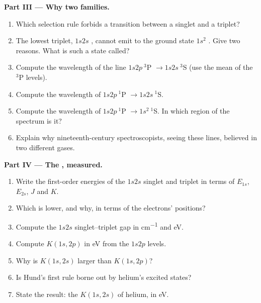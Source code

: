 \begin{problem}
\medskip\noindent\textbf{Part III --- Why two families.}
\begin{enumerate}[resume]
  \item Which selection rule forbids a transition between a singlet and a
        triplet?
  \item The lowest triplet, $1s2s$ , cannot emit to the ground
        state $1s^2$ . Give two reasons. What is such a state
        called?
  \item Compute the wavelength of the line $1s2p\ {}^3$P $\to 1s2s\ {}^3$S (use
        the mean of the ${}^3$P levels).
  \item Compute the wavelength of $1s2p\ {}^1$P $\to 1s2s\ {}^1$S.
  \item Compute the wavelength of $1s2p\ {}^1$P $\to 1s^2\ {}^1$S. In which
        region of the spectrum is it?
  \item Explain why nineteenth-century spectroscopists, seeing these lines,
        believed in two different gases.
\end{enumerate}

\medskip\noindent\textbf{Part IV --- The , measured.}
\begin{enumerate}[resume]
  \item Write the first-order energies of the $1s2s$ singlet and triplet in
        terms of $E_{1s}$, $E_{2s}$, $J$ and $K$.
  \item Which is lower, and why, in terms of the electrons' positions?
  \item Compute the $1s2s$ singlet--triplet gap in \unit{cm^{-1}} and eV.
  \item Compute $K(1s,2p)$ in eV from the $1s2p$ levels.
  \item Why is $K(1s,2s)$ larger than $K(1s,2p)$?
  \item Is Hund's first rule borne out by helium's excited states?
  \item State the result: the  $K(1s,2s)$ of helium, in
        eV.
\end{enumerate}
\end{problem}
